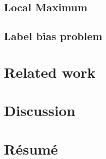 \documentclass[a4paper]{article}
\begin{document}
\subsection{Local Maximum}

\subsection{Label bias problem}

\section{Related work}
\section{Discussion}
\section{Résumé}
\cite{greenwade93}




\end{document}
